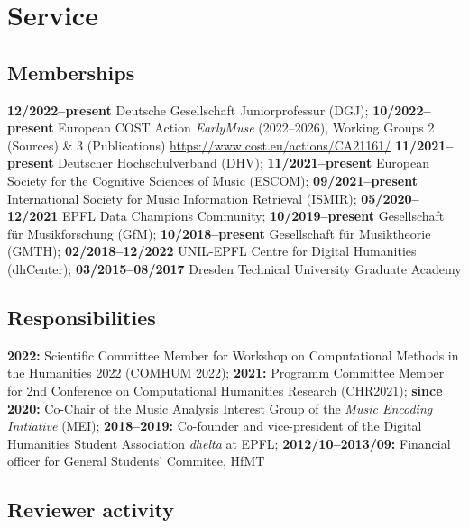 \section{Service}

\subsection{Memberships}

\textbf{12/2022--present} Deutsche Gesellschaft Juniorprofessur (DGJ);
\textbf{10/2022--present} European COST Action \emph{EarlyMuse} (2022--2026), Working Groups 2 (Sources) \& 3 (Publications) \url{https://www.cost.eu/actions/CA21161/}
\textbf{11/2021--present} Deutscher Hochschulverband (DHV);
\textbf{11/2021--present} European Society for the Cognitive Sciences of Music (ESCOM);
\textbf{09/2021--present} International Society for Music Information Retrieval (ISMIR);
\textbf{05/2020--12/2021} EPFL Data Champions Community;
\textbf{10/2019--present} Gesellschaft f{\"u}r Musikforschung (GfM);
\textbf{10/2018--present} Gesellschaft f{\"u}r Musiktheorie (GMTH);
\textbf{02/2018--12/2022} UNIL-EPFL Centre for Digital Humanities (dhCenter);
\textbf{03/2015--08/2017} Dresden Technical University Graduate Academy

\subsection{Responsibilities}

\textbf{2022:} Scientific Committee Member for Workshop on Computational Methods in the Humanities 2022 (COMHUM 2022);
\textbf{2021:} Programm Committee Member for 2nd Conference on Computational Humanities Research (CHR2021);
\textbf{since 2020:} Co-Chair of the Music Analysis Interest Group of the \emph{Music Encoding Initiative} (MEI);
\textbf{2018--2019:} Co-founder and vice-president of the Digital Humanities Student Association \emph{dhelta} at EPFL;
\textbf{2012/10--2013/09:} Financial officer for General Students' Commitee, HfMT

\subsection{Reviewer activity}


